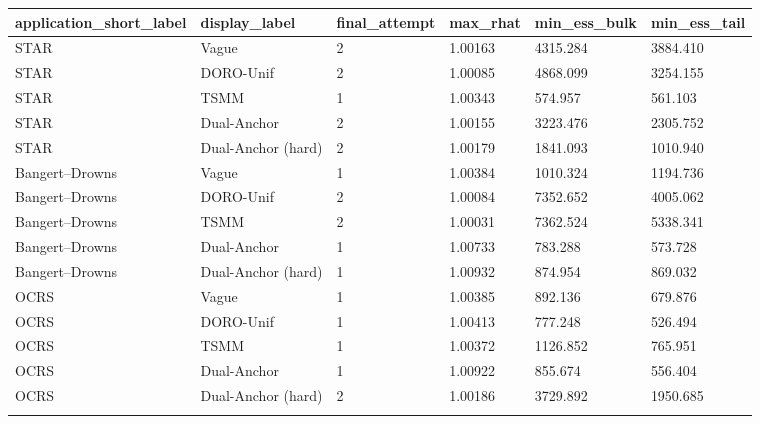 \begin{longtable}{llllll}
\toprule
application\_short\_label & display\_label & final\_attempt & max\_rhat & min\_ess\_bulk & min\_ess\_tail \\
\midrule\endhead
STAR & Vague & 2 & 1.00163 & 4315.284 & 3884.410 \\ \addlinespace[3pt]
STAR & DORO-Unif & 2 & 1.00085 & 4868.099 & 3254.155 \\ \addlinespace[3pt]
STAR & TSMM & 1 & 1.00343 & 574.957 & 561.103 \\ \addlinespace[3pt]
STAR & Dual-Anchor & 2 & 1.00155 & 3223.476 & 2305.752 \\ \addlinespace[3pt]
STAR & Dual-Anchor (hard) & 2 & 1.00179 & 1841.093 & 1010.940 \\ \addlinespace[3pt]
Bangert--Drowns & Vague & 1 & 1.00384 & 1010.324 & 1194.736 \\ \addlinespace[3pt]
Bangert--Drowns & DORO-Unif & 2 & 1.00084 & 7352.652 & 4005.062 \\ \addlinespace[3pt]
Bangert--Drowns & TSMM & 2 & 1.00031 & 7362.524 & 5338.341 \\ \addlinespace[3pt]
Bangert--Drowns & Dual-Anchor & 1 & 1.00733 & 783.288 & 573.728 \\ \addlinespace[3pt]
Bangert--Drowns & Dual-Anchor (hard) & 1 & 1.00932 & 874.954 & 869.032 \\ \addlinespace[3pt]
OCRS & Vague & 1 & 1.00385 & 892.136 & 679.876 \\ \addlinespace[3pt]
OCRS & DORO-Unif & 1 & 1.00413 & 777.248 & 526.494 \\ \addlinespace[3pt]
OCRS & TSMM & 1 & 1.00372 & 1126.852 & 765.951 \\ \addlinespace[3pt]
OCRS & Dual-Anchor & 1 & 1.00922 & 855.674 & 556.404 \\ \addlinespace[3pt]
OCRS & Dual-Anchor (hard) & 2 & 1.00186 & 3729.892 & 1950.685 \\ \addlinespace[3pt]
\bottomrule\end{longtable}
